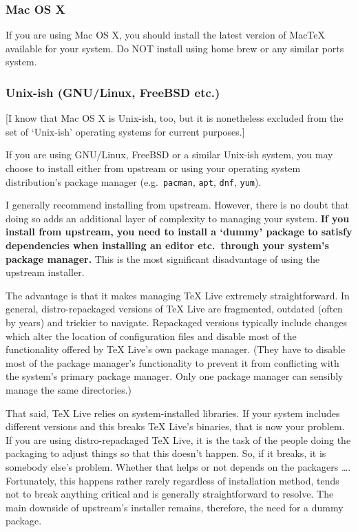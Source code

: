 \subsubsection<1-| beamer:0>{Mac OS X}\label{subsubsec:osx}

If you are using Mac OS X, you should install the latest version of Mac\TeX{} available for your system.
Do NOT install using home brew or any similar ports system.


\subsubsection<1-| beamer:0>{Unix-ish (GNU/Linux, FreeBSD etc.)}\label{subsubsec:unx}

[I know that Mac OS X is Unix-ish, too, but it is nonetheless excluded from the set of ‘Unix-ish’ operating systems for current purposes.]

If you are using GNU/Linux, FreeBSD or a similar Unix-ish system, you may choose to install either from upstream or using your operating system distribution's package manager (e.g.~\texttt{pacman}, \texttt{apt}, \texttt{dnf}, \texttt{yum}).

I generally recommend installing from upstream.
However, there is no doubt that doing so adds an additional layer of complexity to managing your system.
\textbf{If you install from upstream, you need to install a ‘dummy’ package to satisfy dependencies when installing an editor etc.\ through your system's package manager.}
This is the most significant disadvantage of using the upstream installer.

The advantage is that it makes managing \TeX{} Live extremely straightforward.
In general, distro-repackaged versions of \TeX{} Live are fragmented, outdated (often by years) and trickier to navigate.
Repackaged versions typically include changes which alter the location of configuration files and disable most of the functionality offered by \TeX{} Live's own package manager. 
(They have to disable most of the package manager's functionality to prevent it from conflicting with the system's primary package manager.
Only one package manager can sensibly manage the same directories.)

That said, \TeX{} Live relies on system-installed libraries.
If your system includes different versions and this breaks \TeX{} Live's binaries, that is now your problem.
If you are using distro-repackaged \TeX{} Live, it is the task of the people doing the packaging to adjust things so that this doesn't happen.
So, if it breaks, it is somebody else's problem. 
Whether that helps or not depends on the packagers \dots. 
Fortunately, this happens rather rarely regardless of installation method, tends not to break anything critical and is generally straightforward to resolve.
The main downside of upstream's installer remains, therefore, the need for a dummy package.

